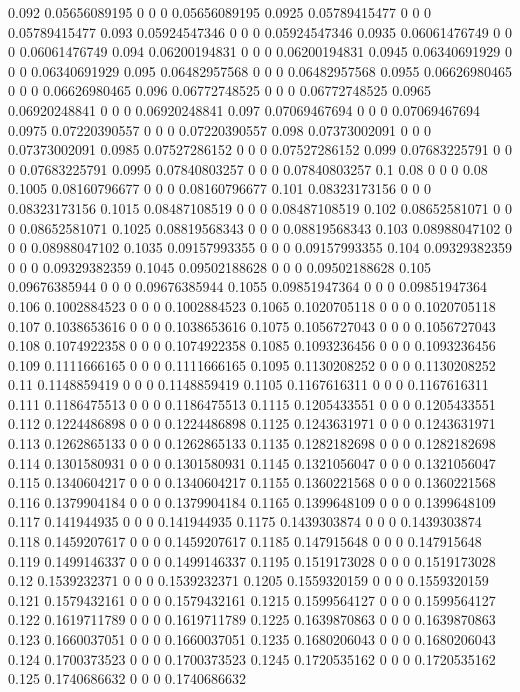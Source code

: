{0.092 0.05656089195 0 0 0 0.05656089195
0.0925 0.05789415477 0 0 0 0.05789415477
0.093 0.05924547346 0 0 0 0.05924547346
0.0935 0.06061476749 0 0 0 0.06061476749
0.094 0.06200194831 0 0 0 0.06200194831
0.0945 0.06340691929 0 0 0 0.06340691929
0.095 0.06482957568 0 0 0 0.06482957568
0.0955 0.06626980465 0 0 0 0.06626980465
0.096 0.06772748525 0 0 0 0.06772748525
0.0965 0.06920248841 0 0 0 0.06920248841
0.097 0.07069467694 0 0 0 0.07069467694
0.0975 0.07220390557 0 0 0 0.07220390557
0.098 0.07373002091 0 0 0 0.07373002091
0.0985 0.07527286152 0 0 0 0.07527286152
0.099 0.07683225791 0 0 0 0.07683225791
0.0995 0.07840803257 0 0 0 0.07840803257
0.1 0.08 0 0 0 0.08
0.1005 0.08160796677 0 0 0 0.08160796677
0.101 0.08323173156 0 0 0 0.08323173156
0.1015 0.08487108519 0 0 0 0.08487108519
0.102 0.08652581071 0 0 0 0.08652581071
0.1025 0.08819568343 0 0 0 0.08819568343
0.103 0.08988047102 0 0 0 0.08988047102
0.1035 0.09157993355 0 0 0 0.09157993355
0.104 0.09329382359 0 0 0 0.09329382359
0.1045 0.09502188628 0 0 0 0.09502188628
0.105 0.09676385944 0 0 0 0.09676385944
0.1055 0.09851947364 0 0 0 0.09851947364
0.106 0.1002884523 0 0 0 0.1002884523
0.1065 0.1020705118 0 0 0 0.1020705118
0.107 0.1038653616 0 0 0 0.1038653616
0.1075 0.1056727043 0 0 0 0.1056727043
0.108 0.1074922358 0 0 0 0.1074922358
0.1085 0.1093236456 0 0 0 0.1093236456
0.109 0.1111666165 0 0 0 0.1111666165
0.1095 0.1130208252 0 0 0 0.1130208252
0.11 0.1148859419 0 0 0 0.1148859419
0.1105 0.1167616311 0 0 0 0.1167616311
0.111 0.1186475513 0 0 0 0.1186475513
0.1115 0.1205433551 0 0 0 0.1205433551
0.112 0.1224486898 0 0 0 0.1224486898
0.1125 0.1243631971 0 0 0 0.1243631971
0.113 0.1262865133 0 0 0 0.1262865133
0.1135 0.1282182698 0 0 0 0.1282182698
0.114 0.1301580931 0 0 0 0.1301580931
0.1145 0.1321056047 0 0 0 0.1321056047
0.115 0.1340604217 0 0 0 0.1340604217
0.1155 0.1360221568 0 0 0 0.1360221568
0.116 0.1379904184 0 0 0 0.1379904184
0.1165 0.1399648109 0 0 0 0.1399648109
0.117 0.141944935 0 0 0 0.141944935
0.1175 0.1439303874 0 0 0 0.1439303874
0.118 0.1459207617 0 0 0 0.1459207617
0.1185 0.147915648 0 0 0 0.147915648
0.119 0.1499146337 0 0 0 0.1499146337
0.1195 0.1519173028 0 0 0 0.1519173028
0.12 0.1539232371 0 0 0 0.1539232371
0.1205 0.1559320159 0 0 0 0.1559320159
0.121 0.1579432161 0 0 0 0.1579432161
0.1215 0.1599564127 0 0 0 0.1599564127
0.122 0.1619711789 0 0 0 0.1619711789
0.1225 0.1639870863 0 0 0 0.1639870863
0.123 0.1660037051 0 0 0 0.1660037051
0.1235 0.1680206043 0 0 0 0.1680206043
0.124 0.1700373523 0 0 0 0.1700373523
0.1245 0.1720535162 0 0 0 0.1720535162
0.125 0.1740686632 0 0 0 0.1740686632
}
